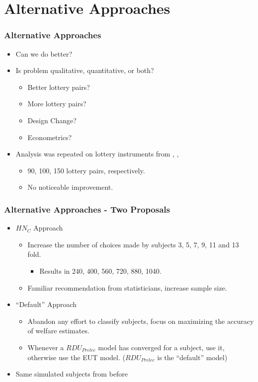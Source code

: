 \documentclass{beamer}
\begin{document}
\section{Alternative Approaches}
\begin{frame}
\frametitle{Alternative Approaches}
\begin{itemize}
	\item Can we do better?
	\item Is problem qualitative, quantitative, or both?
		\begin{itemize}
			\item Better lottery pairs?
			\item More lottery pairs?
			\item Design Change?
			\item Econometrics?
		\end{itemize}
	\item Analysis was repeated on lottery instruments from \textcite{Hey1994}, \textcite{Loomes2002}, \textcite{Schmidt2004}
		\begin{itemize}
			\item 90, 100, 150 lottery pairs, respectively.
			\item No noticeable improvement.
		\end{itemize}
\end{itemize}
\end{frame}

\begin{frame}
\frametitle{Alternative Approaches - Two Proposals}
\begin{itemize}
	\item ${HN}_{C}$ Approach
		\begin{itemize}
			\item Increase the number of choices made by subjects 3, 5, 7, 9, 11 and 13 fold.
				\begin{itemize}
					\item Results in 240, 400, 560, 720, 880, 1040.
				\end{itemize}
			\item Familiar recommendation from statisticians, increase sample size.
		\end{itemize}
	\item \enquote{Default} Approach
		\begin{itemize}
			\item Abandon any effort to classify subjects, focus on maximizing the accuracy of welfare estimates.
			\item Whenever a $\mathit{RDU_{Prelec}}$ model has converged for a subject, use it, otherwise use the EUT model. ($\mathit{RDU_{Prelec}}$ is the \enquote{default} model)
		\end{itemize}
	\item Same simulated subjects from before
\end{itemize}
\end{frame}
\end{document}
